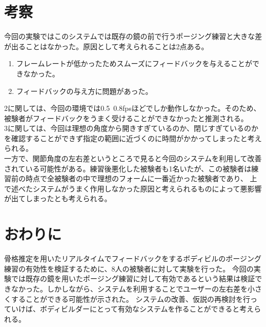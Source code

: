 \documentclass[a4j,10pt]{jsarticle}
\begin{document}
\section{考察}
今回の実験ではこのシステムでは既存の鏡の前で行うポージング練習と大きな差が出ることはなかった。原因として考えられることは2点ある。
\begin{enumerate}
    \item フレームレートが低かったためスムーズにフィードバックを与えることができなかった。
    \item フィードバックの与え方に問題があった。
\end{enumerate}
2に関しては、今回の環境では0.5~0.8fpsほどでしか動作しなかった。そのため、
被験者がフィードバックをうまく受けることができなかったと推測される。\\
3に関しては、今回は理想の角度から開きすぎているのか、閉じすぎているのかを確認することができず指定の範囲に近づくのに時間がかかってしまったと考えられる。\\
一方で、関節角度の左右差というところで見ると今回のシステムを利用して改善されている可能性がある。練習後悪化した被験者も1名いたが、この被験者は練習前の時点で全被験者の中で理想のフォームに一番近かった被験者であり、
上で述べたシステムがうまく作用しなかった原因と考えられるものによって悪影響が出てしまったとも考えられる。
\section{おわりに}
骨格推定を用いたリアルタイムでフィードバックをするボディビルのポージング練習の有効性を検証するために、8人の被験者に対して実験を行った。
今回の実験では既存の鏡を用いたポージング練習に対して有効であるという結果は検証できなかった。しかしながら、システムを利用することでユーザーの左右差を小さくすることができる可能性が示された。
システムの改善、仮説の再検討を行っていけば、ボディビルダーにとって有効なシステムを作ることができると考えられる。



\end{document}
